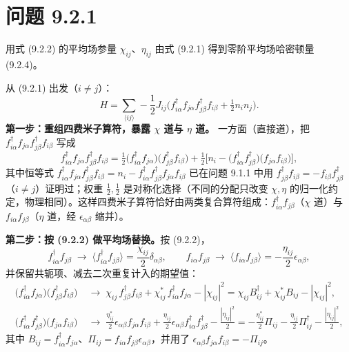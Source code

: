 \section*{问题 9.2.1}
\begin{problem}
用式 (9.2.2) 的平均场参量 $\chi_{ij}$、$\eta_{ij}$ 由式 (9.2.1) 得到零阶平均场哈密顿量 (9.2.4)。
\end{problem}
\solution
从 (9.2.1) 出发（$i\neq j$）：
\begin{equation*}
H=\sum_{\langle ij\rangle}-\frac12 J_{ij}\Big(f^{\dagger}_{i\alpha}f_{j\alpha}f^{\dagger}_{j\beta}f_{i\beta}+\tfrac12 n_in_j\Big).
\end{equation*}
\textbf{第一步：重组四费米子算符，暴露 $\chi$ 道与 $\eta$ 道。}
一方面（直接道），把 $f^{\dagger}_{i\alpha}f_{j\alpha}f^{\dagger}_{j\beta}f_{i\beta}$ 写成
\begin{equation*}
f^{\dagger}_{i\alpha}f_{j\alpha}f^{\dagger}_{j\beta}f_{i\beta}
=\tfrac12\big(f^{\dagger}_{i\alpha}f_{j\alpha}\big)\big(f^{\dagger}_{j\beta}f_{i\beta}\big)+\tfrac12\Big[n_i-\big(f^{\dagger}_{i\alpha}f^{\dagger}_{j\beta}\big)\big(f_{j\alpha}f_{i\beta}\big)\Big] ,
\end{equation*}
其中恒等式 $f^{\dagger}_{i\alpha}f_{j\alpha}f^{\dagger}_{j\beta}f_{i\beta}=n_i-f^{\dagger}_{i\alpha}f^{\dagger}_{j\beta}f_{j\alpha}f_{i\beta}$ 已在问题 9.1.1 中用 $f^{\dagger}_{j\beta}f_{i\beta}=-f_{i\beta}f^{\dagger}_{j\beta}$（$i\neq j$）证明过；权重 $\frac12,\frac12$ 是对称化选择（不同的分配只改变 $\chi,\eta$ 的归一化约定，物理相同）。这样四费米子算符恰好由两类复合算符组成：$f^{\dagger}_{i\alpha}f_{j\beta}$（$\chi$ 道）与 $f_{i\alpha}f_{j\beta}$（$\eta$ 道，经 $\epsilon_{\alpha\beta}$ 缩并）。

\textbf{第二步：按 (9.2.2) 做平均场替换。}按 (9.2.2)，
\begin{equation*}
f^{\dagger}_{i\alpha}f_{j\beta}\;\to\;\Big\langle f^{\dagger}_{i\alpha}f_{j\beta}\Big\rangle=\frac{\chi_{ij}}{2}\delta_{\alpha\beta},\qquad
f_{i\alpha}f_{j\beta}\;\to\;\Big\langle f_{i\alpha}f_{j\beta}\Big\rangle=-\frac{\eta_{ij}}{2}\epsilon_{\alpha\beta} ,
\end{equation*}
并保留共轭项、减去二次重复计入的期望值：
\begin{align*}
\big(f^{\dagger}_{i\alpha}f_{j\alpha}\big)\big(f^{\dagger}_{j\beta}f_{i\beta}\big)
&\;\to\;\chi_{ij}\,f^{\dagger}_{j\beta}f_{i\beta}+\chi^{*}_{ij}\,f^{\dagger}_{i\alpha}f_{j\alpha}-|\chi_{ij}|^{2}
=\chi_{ij}B^{\dagger}_{ij}+\chi^{*}_{ij}B_{ij}-|\chi_{ij}|^{2} ,\\
\big(f^{\dagger}_{i\alpha}f^{\dagger}_{j\beta}\big)\big(f_{j\alpha}f_{i\beta}\big)
&\;\to\;\frac{\eta^{*}_{ij}}{2}\epsilon_{\alpha\beta}f_{j\alpha}f_{i\beta}
+\frac{\eta_{ij}}{2}\epsilon_{\alpha\beta}f^{\dagger}_{i\alpha}f^{\dagger}_{j\beta}-\frac{|\eta_{ij}|^{2}}{2}
=-\frac{\eta^{*}_{ij}}{2}\Pi_{ij}-\frac{\eta_{ij}}{2}\Pi^{\dagger}_{ij}-\frac{|\eta_{ij}|^{2}}{2} ,
\end{align*}
其中 $B_{ij}=f^{\dagger}_{i\alpha}f_{j\alpha}$、$\Pi_{ij}=f_{i\alpha}f_{j\beta}\epsilon_{\alpha\beta}$，并用了 $\epsilon_{\alpha\beta}f_{j\alpha}f_{i\beta}=-\Pi_{ij}$。

